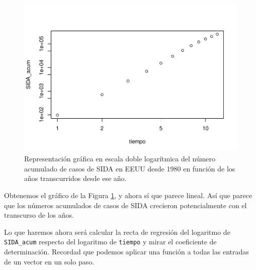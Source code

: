 \documentclass[
]{book}
\newenvironment{Shaded}{\begin{snugshade}}{\end{snugshade}}
\newcommand{\CommentTok}[1]{\textcolor[rgb]{0.56,0.35,0.01}{\textit{#1}}}
\newcommand{\DataTypeTok}[1]{\textcolor[rgb]{0.13,0.29,0.53}{#1}}
\newcommand{\KeywordTok}[1]{\textcolor[rgb]{0.13,0.29,0.53}{\textbf{#1}}}
\newcommand{\NormalTok}[1]{#1}
\newcommand{\OperatorTok}[1]{\textcolor[rgb]{0.81,0.36,0.00}{\textbf{#1}}}
\theoremstyle{definition}
\theoremstyle{definition}
\theoremstyle{definition}
\theoremstyle{remark}
\begin{document}
\begin{figure}

{\centering \includegraphics[width=0.9\linewidth]{03chap02_Un_aperitivo_files/figure-latex/F307c-1} 

}

\caption{Representación gráfica en escala doble logarítmica  del número acumulado de casos de SIDA en EEUU desde 1980 en función de los años transcurridos desde ese año.}\label{fig:F307c}
\end{figure}

Obtenemos el gráfico de la Figura \ref{fig:F307c}, y ahora sí que parece lineal. Así que parece que los números acumulados de casos de SIDA crecieron potencialmente con el transcurso de los años.

Lo que haremos ahora será calcular la recta de regresión del logaritmo de \texttt{SIDA\_acum} respecto del logaritmo de \texttt{tiempo} y mirar el coeficiente de determinación. Recordad que podemos aplicar una función a todas las entradas de un vector en un solo paso.

\begin{Shaded}
\end{Shaded}
\end{document}
